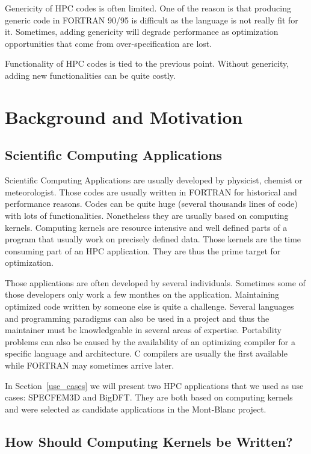 \documentclass[11pt, a4paper, twoside]{montblanc}
\begin{document}
Genericity of HPC codes is often limited. One of the reason is that producing
generic code in FORTRAN 90/95 is difficult as the language is not really fit
for it. Sometimes, adding genericity will degrade performance as optimization
opportunities that come from over-specification are lost.

Functionality of HPC codes is tied to the previous point. Without genericity,
adding new functionalities can be quite costly.

\section{Background and Motivation}

  \subsection{Scientific Computing Applications}

Scientific Computing Applications are usually developed by physicist, chemist or
meteorologist. Those codes are usually written in FORTRAN for historical and
performance reasons. Codes can be quite huge (several thousands lines of code)
with lots of functionalities. Nonetheless they are usually based on computing
kernels.  Computing kernels are resource intensive and well defined parts of a
program that usually work on precisely defined data. Those kernels are the time
consuming part of an HPC application. They are thus the prime target for
optimization.

Those applications are often developed by several individuals. Sometimes some
of those developers only work a few monthes on the application. Maintaining
optimized code written by someone else is quite a challenge. Several languages
and programming paradigms can also be used in a project and thus the maintainer
must be knowledgeable in several areas of expertise. Portability problems can
also be caused by the availability of an optimizing compiler for a specific
language and architecture. C compilers are usually the first available while
FORTRAN may sometimes arrive later.

In Section~\ref{use_cases} we will present two HPC applications that we used
as use cases: SPECFEM3D and BigDFT. They are both based on computing
kernels and were selected as candidate applications in the Mont-Blanc project.

  \subsection{How Should Computing Kernels be Written?}
\end{document}
